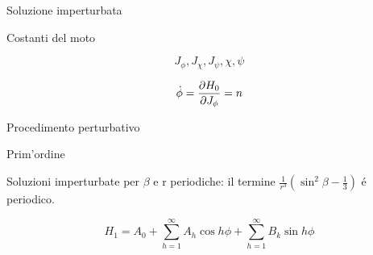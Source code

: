 \begin{wordonframe}{Soluzione imperturbata}

\begin{block}{Costanti del moto}

\begin{equation*}
J_{\phi}, J_{\chi}, J_{\psi}, \chi, \psi
\end{equation*}


\end{block}

\begin{equation*}
\dot{\phi}=\PDy{J_{\phi}}{H_0}=n
\end{equation*}



\end{wordonframe}



\begin{frame}{Procedimento perturbativo}



\begin{block}{Prim'ordine}

Soluzioni imperturbate per $\beta$ e r periodiche: il termine $\frac{1}{r^3}(\sin^2{\beta}-\frac{1}{3})$ \'e periodico.

\begin{equation*}
H_1=A_0+\sum_{h=1}^{\infty}A_h\cos{h\phi}+\sum_{h=1}^{\infty}B_k\sin{h\phi}
\end{equation*}


\end{block}


\end{frame}

